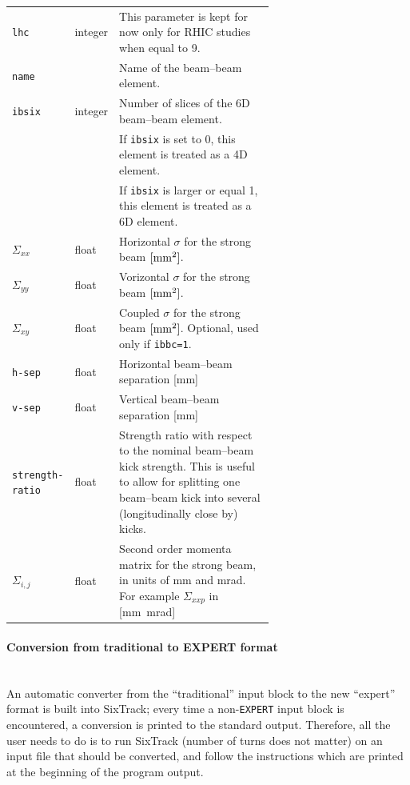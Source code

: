 \bigskip
\begin{longtabu}{@{}llp{0.65\linewidth}}
    \texttt{lhc}   & integer & This parameter is kept for now only for RHIC studies when equal to 9. \\
    \texttt{name}  &         & Name of the beam--beam element. \\
    \texttt{ibsix} & integer & Number of slices of the 6D beam--beam element.\\
                   &         & If \texttt{ibsix} is set to 0, this element is treated as a 4D element.\\
                   &         & If \texttt{ibsix} is larger or equal 1, this element is treated as a 6D element. \\
    $\Sigma_{xx}$  & float   & Horizontal $\sigma$ for the strong beam $\rm{[mm^2]}$. \\
    $\Sigma_{yy}$  & float   & Vorizontal $\sigma$ for the strong beam $\rm{[mm^2]}$. \\
    $\Sigma_{xy}$  & float   & Coupled $\sigma$ for the strong beam $\rm{[mm^2]}$. Optional, used only if \texttt{ibbc=1}. \\
    \texttt{h-sep} & float   & Horizontal beam--beam separation [mm] \\
    \texttt{v-sep} & float   & Vertical beam--beam separation [mm] \\
    \texttt{strength-ratio} & float & Strength ratio with respect to the nominal beam--beam kick strength. This is useful to allow for splitting one beam--beam kick into several (longitudinally close by) kicks.\\
    $\Sigma_{i,j}$ & float   & Second order momenta matrix for the strong beam, in units of mm and mrad. For example $\Sigma_{xxp}$ in [mm\ mrad]
\end{longtabu}

\paragraph{Conversion from traditional to EXPERT format}~\\

An automatic converter from the ``traditional'' input block to the new ``expert'' format is built into SixTrack; every time a non-\texttt{EXPERT} input block is encountered, a conversion is printed to the standard output.
Therefore, all the user needs to do is to run SixTrack (number of turns does not matter) on an input file that should be converted, and follow the instructions which are printed at the beginning of the program output.

